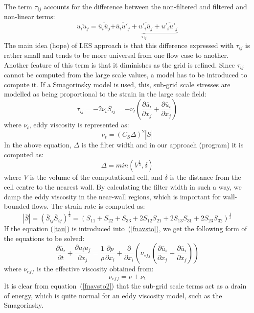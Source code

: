 \documentclass[10pt]{article}
\newcommand*{\p}{\partial}
\newcommand*{\ol}{\overline}
\begin{document}
    The term $\tau_{ij}$ accounts for the difference between the
    non-filtered and filtered and non-linear terms:
    \begin{equation}
    \ol{u_i u_j} = \ol{\ol{u}_i \ol{u}_j}
                 \underbrace{
                 + \ol{\ol{u}_i u'_j} 
                 + \ol{u'_i \ol{u}_j} 
                 + \ol{u'_i u'_j}
                 }_{\tau_{ij}} 
    \end{equation} 
    The main idea (hope) of LES approach is that this difference
    expressed with $\tau_{ij}$ is rather small and tends to be 
    more universal from one flow case to another. Another feature
    of this term is that it diminishes as the grid is refined.
    Since $\tau_{ij}$ cannot be computed from the large scale
    values, a model has to be introduced to compute it. If a
    Smagorinsky model is used, this, sub-grid scale stresses are
    modelled as being proportional to the strain in the large
    scale field:
    \begin{equation}
    \tau_{ij} = -2 \nu_t \ol{S}_{ij} 
              = -\nu_t (\frac{\p \ol{u}_i}{\p x_j}+\frac{\p \ol{u}_i}{\p x_j})  
    \label{tau}
    \end{equation} 
    where $\nu_t$, eddy viscosity is represented as:
    \begin{equation}
    \nu_t = (C_S \Delta)^2 |\ol{S}|
    \end{equation} 
    In the above equation, $\Delta$ is the filter width and in
    our approach (program) it is computed as:
    \begin{equation}
    \Delta = min(V^{\frac{1}{3}}, \delta)
    \end{equation}
    where $V$ is the volume of the computational cell, and $\delta$
    is the distance from the cell centre to the nearest wall. By
    calculating the filter width in such a way, we damp the 
    eddy viscosity in the near-wall regions, which is important
    for wall-bounded flows. 
    The strain rate is computed as:
    \begin{equation}
    |\ol{S}| = (\ol{S}_{ij} \ol{S}_{ij})^{\frac{1}{2}} 
             = (S_{11}+S_{22}+S_{33}
                + 2 S_{12} S_{21}
                + 2 S_{13} S_{31}
                + 2 S_{23} S_{32} ) ^ {\frac{1}{2}}
    \end{equation}
    If the equation (\ref{tau}) is introduced into~(\ref{fnavsto}),
    we get the following form of the equations to be solved: 
    \begin{equation}
    \frac{\p \ol{u}_i}{\p t}+
    \frac{\p \ol{u_i u_j}}{\p x_j}=
    \frac{1}{\rho}\frac{\p p}{\p x_i} + 
    \frac{\p}{\p x_i}(\nu_{\mathit{eff}} (\frac{\p \ol{u}_i}{\p x_j}+\frac{\p \ol{u}_i}{\p x_j}))
    \label{fnavsto2}
    \end{equation}
    where $\nu_{\mathit{eff}}$ is the effective viscosity obtained 
    from:
    \begin{equation}
    \nu_{\mathit{eff}} = \nu + \nu_t
    \label{eddy}
    \end{equation}
    It is clear from equation~(\ref{fnavsto2}) that the sub-grid
    scale terms act as a drain of energy, which is quite normal
    for an eddy viscosity model, such as the Smagorinsky.  
\end{document}
